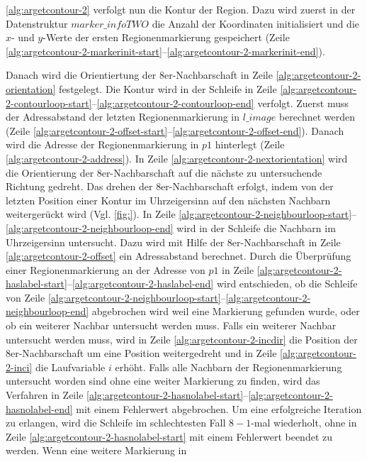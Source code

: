 \autoref{alg:argetcontour-2} verfolgt nun die Kontur der Region. Dazu wird zuerst in der Datenstruktur
 $\mathit{marker\_infoTWO}$ die Anzahl der Koordinaten initialisiert und die $x$- und $y$-Werte der ersten
 Regionenmarkierung gespeichert (Zeile
 \ref{alg:argetcontour-2-markerinit-start}--\ref{alg:argetcontour-2-markerinit-end}).

Danach wird die Orientiertung der 8er-Nachbarschaft in Zeile \ref{alg:argetcontour-2-orientation} festgelegt. Die
 Kontur wird in der Schleife in Zeile
 \ref{alg:argetcontour-2-contourloop-start}--\ref{alg:argetcontour-2-contourloop-end} verfolgt. Zuerst muss der
 Adressabstand der letzten Regionenmarkierung in $\mathit{l\_image}$ berechnet werden (Zeile
 \ref{alg:argetcontour-2-offset-start}--\ref{alg:argetcontour-2-offset-end}). Danach wird die Adresse der
 Regionenmarkierung in $\mathit{p1}$ hinterlegt (Zeile \ref{alg:argetcontour-2-address}). In Zeile
 \ref{alg:argetcontour-2-nextorientation} wird die Orientierung der 8er-Nachbarschaft auf die nächste zu untersuchende
 Richtung gedreht. Das drehen der 8er-Nachbarschaft erfolgt, indem von der letzten Position einer Kontur im
 Uhrzeigersinn auf den nächsten Nachbarn weitergerückt wird (Vgl. \autoref{fig:}). In Zeile
 \ref{alg:argetcontour-2-neighbourloop-start}--\ref{alg:argetcontour-2-neighbourloop-end} wird in der Schleife die
 Nachbarn im Uhrzeigersinn untersucht. Dazu wird mit Hilfe der 8er-Nachbarschaft in Zeile
 \ref{alg:argetcontour-2-offset} ein Adressabstand berechnet. Durch die Überprüfung einer Regionenmarkierung an der
 Adresse von $\mathit{p1}$ in Zeile \ref{alg:argetcontour-2-haslabel-start}--\ref{alg:argetcontour-2-haslabel-end} wird
 entschieden, ob die Schleife von Zeile
 \ref{alg:argetcontour-2-neighbourloop-start}--\ref{alg:argetcontour-2-neighbourloop-end} abgebrochen wird weil eine
 Markierung gefunden wurde, oder ob ein weiterer Nachbar untersucht werden muss. Falls ein weiterer Nachbar untersucht
 werden muss, wird in Zeile \ref{alg:argetcontour-2-incdir} die Position der 8er-Nachbarschaft um eine Position
 weitergedreht und in Zeile \ref{alg:argetcontour-2-inci} die Laufvariable $i$ erhöht. Falls alle Nachbarn der
 Regionenmarkierung untersucht worden sind ohne eine weiter Markierung zu finden, wird das Verfahren in Zeile
 \ref{alg:argetcontour-2-hasnolabel-start}--\ref{alg:argetcontour-2-hasnolabel-end} mit einem Fehlerwert abgebrochen.
 Um eine erfolgreiche Iteration zu erlangen, wird die Schleife im schlechtesten Fall $8-1$-mal wiederholt, ohne in Zeile
 \ref{alg:argetcontour-2-hasnolabel-start} mit einem Fehlerwert beendet zu werden. Wenn eine weitere Markierung in
